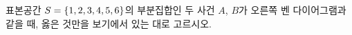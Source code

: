 \noindent\begin{minipage}[t]{0.58\linewidth}\vspace{0pt}\raggedright 표본공간 $S=\{1{,}\mkern3mu\mathopen{}2{,}\mkern3mu\mathopen{}3{,}\mkern3mu\mathopen{}4{,}\mkern3mu\mathopen{}5{,}\mkern3mu\mathopen{}6\}$의 부분집합인 두 사건 $A$, $B$가 오른쪽 벤 다이어그램과 같을 때, 옳은 것만을 보기에서 있는 대로 고르시오.\end{minipage}\hfill\begin{minipage}[t]{0.4\linewidth}\vspace{0pt}\centering \resizebox{\ifdim\width>\linewidth\linewidth\else\width\fi}{!}{}\end{minipage}\par
\noindent {}
